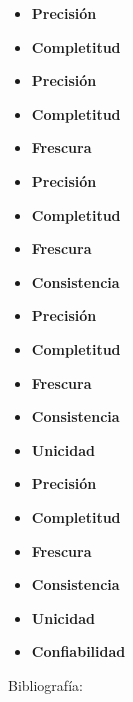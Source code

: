 \documentclass{fancyslides}
\begin{document}
\begin{frame}
\misc
{
\begin{itemize}
  \item \textbf{Precisión}
  \item \textbf{Completitud}
\end{itemize}

}
\end{frame}

\begin{frame}
\misc
{
\begin{itemize}
  \item \textbf{Precisión}
  \item \textbf{Completitud}
  \item \textbf{Frescura}
\end{itemize}

}
\end{frame}

\begin{frame}
\misc
{
\begin{itemize}
  \item \textbf{Precisión}
  \item \textbf{Completitud}
  \item \textbf{Frescura}
  \item \textbf{Consistencia}
\end{itemize}

}
\end{frame}

\begin{frame}
\misc
{
\begin{itemize}
  \item \textbf{Precisión}
  \item \textbf{Completitud}
  \item \textbf{Frescura}
  \item \textbf{Consistencia}
  \item \textbf{Unicidad}
\end{itemize}

}
\end{frame}

\begin{frame}
\misc
{
\begin{itemize}
  \item \textbf{Precisión}
  \item \textbf{Completitud}
  \item \textbf{Frescura}
  \item \textbf{Consistencia}
  \item \textbf{Unicidad}
  \item \textbf{Confiabilidad}
\end{itemize}

}
\end{frame}

\begin{frame}
\end{frame}

\begin{frame}
\misc
{

}
\end{frame}



\begin{frame}
\misc
{ Bibliografía:

\printbibliography
}
\end{frame}
\end{document}
